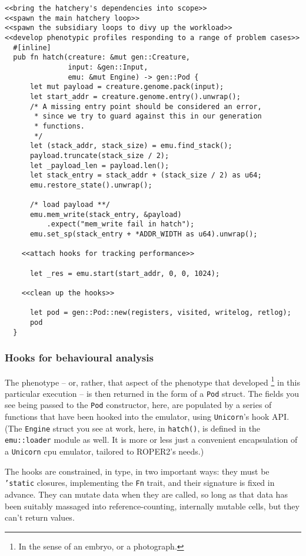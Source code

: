 \documentclass[11pt]{article}
\begin{document}
\lstset{language=rust,label=org3611bea,caption= ,captionpos=b,numbers=none}
\begin{lstlisting}
<<bring the hatchery's dependencies into scope>>
<<spawn the main hatchery loop>>
<<spawn the subsidiary loops to divy up the workload>>
<<develop phenotypic profiles responding to a range of problem cases>>
  #[inline]
  pub fn hatch(creature: &mut gen::Creature, 
               input: &gen::Input, 
               emu: &mut Engine) -> gen::Pod {
      let mut payload = creature.genome.pack(input);
      let start_addr = creature.genome.entry().unwrap();
      /* A missing entry point should be considered an error,
       * since we try to guard against this in our generation
       * functions.
       */
      let (stack_addr, stack_size) = emu.find_stack();
      payload.truncate(stack_size / 2);
      let _payload_len = payload.len();
      let stack_entry = stack_addr + (stack_size / 2) as u64;
      emu.restore_state().unwrap();

      /* load payload **/
      emu.mem_write(stack_entry, &payload)
          .expect("mem_write fail in hatch");
      emu.set_sp(stack_entry + *ADDR_WIDTH as u64).unwrap();

    <<attach hooks for tracking performance>>

      let _res = emu.start(start_addr, 0, 0, 1024);

    <<clean up the hooks>>

      let pod = gen::Pod::new(registers, visited, writelog, retlog);
      pod
  }
\end{lstlisting}


\subsubsection{Hooks for behavioural analysis}
\label{sec:org60cb497}
The phenotype -- or, rather, that aspect of the phenotype that developed
\footnote{In the sense of an embryo, or a photograph.} in this particular execution
-- is then returned in the form of a \texttt{Pod} struct. The fields you see being
passed to the \texttt{Pod} constructor, here, are populated by a series of functions
that have been hooked into the emulator, using \texttt{Unicorn}'s hook API. (The
\texttt{Engine} struct you see at work, here, in \texttt{hatch()}, is defined in the
\texttt{emu::loader} module as well. It is more or less just a convenient 
encapsulation of a \texttt{Unicorn} \gls{cpu} emulator, tailored to ROPER2's needs.)

The hooks are constrained, in type, in two important ways: they must be
\texttt{'static} closures, implementing the \texttt{Fn} trait, and their signature is
fixed in advance. They can mutate data when they are called, so long as
that data has been suitably massaged into reference-counting, internally
mutable cells, but they can't return values. 
\end{document}
